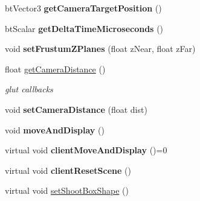 \begin{DoxyCompactItemize}
\item 
\hypertarget{class_demo_application_ac8e885c61370f509a120b8535560dcf6}{bt\+Vector3 {\bfseries get\+Camera\+Target\+Position} ()}\label{class_demo_application_ac8e885c61370f509a120b8535560dcf6}

\item 
\hypertarget{class_demo_application_a972635d287f43a7c7cf9fdb0e3d8caf7}{bt\+Scalar {\bfseries get\+Delta\+Time\+Microseconds} ()}\label{class_demo_application_a972635d287f43a7c7cf9fdb0e3d8caf7}

\item 
\hypertarget{class_demo_application_a3fb26082141b9c5ef8cc19ab6cd0bffa}{void {\bfseries set\+Frustum\+Z\+Planes} (float z\+Near, float z\+Far)}\label{class_demo_application_a3fb26082141b9c5ef8cc19ab6cd0bffa}

\item 
\hypertarget{class_demo_application_a60a2029917a9490a4361361ccf84f2a6}{float \hyperlink{class_demo_application_a60a2029917a9490a4361361ccf84f2a6}{get\+Camera\+Distance} ()}\label{class_demo_application_a60a2029917a9490a4361361ccf84f2a6}

\begin{DoxyCompactList}\small\item\em glut callbacks \end{DoxyCompactList}\item 
\hypertarget{class_demo_application_adc6c0b1a9b89ec322467dafd638ab7c8}{void {\bfseries set\+Camera\+Distance} (float dist)}\label{class_demo_application_adc6c0b1a9b89ec322467dafd638ab7c8}

\item 
\hypertarget{class_demo_application_aa98f66e9b7e085f66902af3ebba1747d}{void {\bfseries move\+And\+Display} ()}\label{class_demo_application_aa98f66e9b7e085f66902af3ebba1747d}

\item 
\hypertarget{class_demo_application_a18bd494530f344ece7a3fcf506d79ba1}{virtual void {\bfseries client\+Move\+And\+Display} ()=0}\label{class_demo_application_a18bd494530f344ece7a3fcf506d79ba1}

\item 
\hypertarget{class_demo_application_ac8f7f70df230013e7f07c7a813476680}{virtual void {\bfseries client\+Reset\+Scene} ()}\label{class_demo_application_ac8f7f70df230013e7f07c7a813476680}

\item 
\hypertarget{class_demo_application_ac1a734ffa2243ae26272d62aee5ab907}{virtual void \hyperlink{class_demo_application_ac1a734ffa2243ae26272d62aee5ab907}{set\+Shoot\+Box\+Shape} ()}\label{class_demo_application_ac1a734ffa2243ae26272d62aee5ab907}


\end{DoxyCompactItemize}
